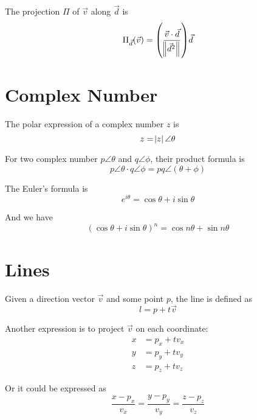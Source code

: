 The projection $\Pi$ of $\vec{v}$ along $\vec{d}$ is
\begin{equation}
    \Pi_{\vec{d}} (\vec{v}) = \mleft(\frac{\vec{v} \cdot \vec{d}}{\length{\vec{d}^2}}\mright) \vec{d}
\end{equation}

\section{Complex Number}

The polar expression of a complex number $z$ is
\begin{equation}
    z = \abs{z} \angle \theta
\end{equation}

For two complex number $p \angle \theta$ and $q \angle \phi$, their product formula is
\begin{equation}
    p \angle \theta \cdot q \angle \phi = pq \angle (\theta + \phi)
\end{equation}

\begin{theorem} The Euler's formula is
\begin{equation}
    e^{i \theta} = \cos \theta + i \sin \theta
\end{equation}

And we have
\begin{equation}
    (\cos \theta + i \sin \theta)^n = \cos n \theta + \sin n \theta
\end{equation}
\end{theorem}


\section{Lines}

\begin{definition}
    Given a direction vector $\vec{v}$ and some point $p$, the line is defined as 
    \begin{equation}
        l = p + t \vec{v}
    \end{equation}
\end{definition}

\begin{definition}
    Another expression is to project $\vec{v}$ on each coordinate:
\begin{equation}
    \begin{aligned}
        x &= p_x + t v_x \\
        y &= p_y + t v_y \\
        z &= p_z + t v_z
    \end{aligned} 
\end{equation}

Or it could be expressed as
\begin{equation}
    \frac{x - p_x}{v_x} = \frac{y - p_y}{v_y}  = \frac{z - p_z}{v_z}
\end{equation}
\end{definition}


